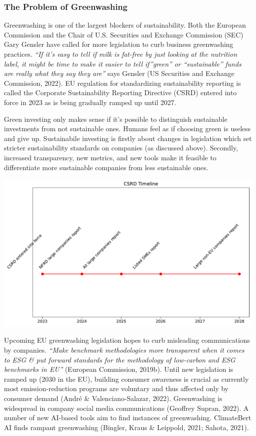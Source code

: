 \documentclass[
  letterpaper,
  DIV=11,
  numbers=noendperiod]{scrartcl}
\begin{document}
\subsubsection{The Problem of
Greenwashing}\label{the-problem-of-greenwashing}

Greenwashing is one of the largest blockers of sustainability. Both the
European Commission and the Chair of U.S. Securities and Exchange
Commission (SEC) Gary Gensler have called for more legislation to curb
business greenwashing practices. \emph{``If it's easy to tell if milk is
fat-free by just looking at the nutrition label, it might be time to
make it easier to tell if''green'' or ``sustainable'' funds are really
what they say they are''} says Gensler (US Securities and Exchange
Commission, 2022). EU regulation for standardizing sustainability
reporting is called the Corporate Sustainability Reporting Directive
(CSRD) entered into force in 2023 as is being gradually ramped up until
2027.

Green investing only makes sense if it's possible to distinguish
sustainable investments from not sustainable ones. Humans feel as if
choosing green is useless and give up. Sustainabile investing is firstly
about changes in legislation which set stricter sustainability standards
on companies (as discussed above). Secondly, increased transparency, new
metrics, and new tools make it feasible to differentiate more
sustainable companies from less sustainable ones.

\includegraphics{_thesis_files/figure-pdf/cell-46-output-1.pdf}

Upcoming EU greenwashing legislation hopes to curb misleading
communications by companies. \emph{``Make benchmark methodologies more
transparent when it comes to ESG \& put forward standards for the
methodology of low-carbon and ESG benchmarks in EU''} (European
Commission, 2019b). Until new legislation is ramped up (2030 in the EU),
building consumer awareness is crucial as currently most
emission-reduction programs are voluntary and thus affected only by
consumer demand (André \& Valenciano-Salazar, 2022). Greenwashing is
widespread in company social media communications (Geoffrey Supran,
2022). A number of new AI-based tools aim to find instances of
greenwashing. ClimateBert AI finds rampant greenwashing (Bingler, Kraus
\& Leippold, 2021; Sahota, 2021).
\end{document}

